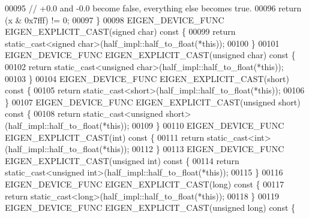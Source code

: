 \begin{DoxyCode}
00095     \textcolor{comment}{// +0.0 and -0.0 become false, everything else becomes true.}
00096     \textcolor{keywordflow}{return} (x & 0x7fff) != 0;
00097   \}
00098   EIGEN\_DEVICE\_FUNC EIGEN\_EXPLICIT\_CAST(\textcolor{keywordtype}{signed} \textcolor{keywordtype}{char})\textcolor{keyword}{ const }\{
00099     \textcolor{keywordflow}{return} \textcolor{keyword}{static\_cast<}\textcolor{keywordtype}{signed} \textcolor{keywordtype}{char}\textcolor{keyword}{>}(half\_impl::half\_to\_float(*\textcolor{keyword}{this}));
00100   \}
00101   EIGEN\_DEVICE\_FUNC EIGEN\_EXPLICIT\_CAST(\textcolor{keywordtype}{unsigned} \textcolor{keywordtype}{char})\textcolor{keyword}{ const }\{
00102     \textcolor{keywordflow}{return} \textcolor{keyword}{static\_cast<}\textcolor{keywordtype}{unsigned} \textcolor{keywordtype}{char}\textcolor{keyword}{>}(half\_impl::half\_to\_float(*\textcolor{keyword}{this}));
00103   \}
00104   EIGEN\_DEVICE\_FUNC EIGEN\_EXPLICIT\_CAST(\textcolor{keywordtype}{short})\textcolor{keyword}{ const }\{
00105     \textcolor{keywordflow}{return} \textcolor{keyword}{static\_cast<}\textcolor{keywordtype}{short}\textcolor{keyword}{>}(half\_impl::half\_to\_float(*\textcolor{keyword}{this}));
00106   \}
00107   EIGEN\_DEVICE\_FUNC EIGEN\_EXPLICIT\_CAST(\textcolor{keywordtype}{unsigned} \textcolor{keywordtype}{short})\textcolor{keyword}{ const }\{
00108     \textcolor{keywordflow}{return} \textcolor{keyword}{static\_cast<}\textcolor{keywordtype}{unsigned} \textcolor{keywordtype}{short}\textcolor{keyword}{>}(half\_impl::half\_to\_float(*\textcolor{keyword}{this}));
00109   \}
00110   EIGEN\_DEVICE\_FUNC EIGEN\_EXPLICIT\_CAST(\textcolor{keywordtype}{int})\textcolor{keyword}{ const }\{
00111     \textcolor{keywordflow}{return} \textcolor{keyword}{static\_cast<}\textcolor{keywordtype}{int}\textcolor{keyword}{>}(half\_impl::half\_to\_float(*\textcolor{keyword}{this}));
00112   \}
00113   EIGEN\_DEVICE\_FUNC EIGEN\_EXPLICIT\_CAST(\textcolor{keywordtype}{unsigned} \textcolor{keywordtype}{int})\textcolor{keyword}{ const }\{
00114     \textcolor{keywordflow}{return} \textcolor{keyword}{static\_cast<}\textcolor{keywordtype}{unsigned} \textcolor{keywordtype}{int}\textcolor{keyword}{>}(half\_impl::half\_to\_float(*\textcolor{keyword}{this}));
00115   \}
00116   EIGEN\_DEVICE\_FUNC EIGEN\_EXPLICIT\_CAST(\textcolor{keywordtype}{long})\textcolor{keyword}{ const }\{
00117     \textcolor{keywordflow}{return} \textcolor{keyword}{static\_cast<}\textcolor{keywordtype}{long}\textcolor{keyword}{>}(half\_impl::half\_to\_float(*\textcolor{keyword}{this}));
00118   \}
00119   EIGEN\_DEVICE\_FUNC EIGEN\_EXPLICIT\_CAST(\textcolor{keywordtype}{unsigned} \textcolor{keywordtype}{long})\textcolor{keyword}{ const }\{

\end{DoxyCode}
